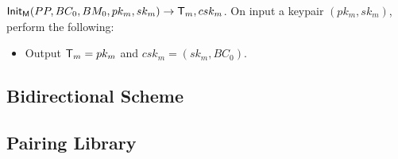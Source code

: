 \documentclass[10pt]{report}
\begin{document}
\medskip \noindent
${\sf Init_{M}}(PP, BC_{0}, BM_{0}, pk_m, sk_m) \rightarrow {\sf T}_m, csk_m$. On input a keypair $(pk_m, sk_m)$, perform the following:

\begin{itemize} 
\item Output ${\sf T}_m = pk_m$ and $csk_m = (sk_m, BC_{0})$.
\end{itemize}


\subsection{Bidirectional Scheme}


\subsection{Pairing Library}
\label{sec:pairings}

%
\end{document}
